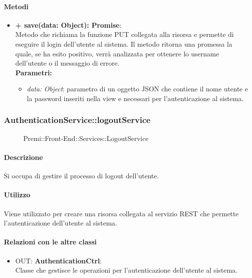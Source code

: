 		\paragraph{Metodi}
		\begin{itemize}
			\item \textbf{+ save(data: Object): Promise}:\\
			Metodo che richiama la funzione PUT collegata alla risorsa e permette di eseguire il login dell'utente al sistema. Il metodo ritorna una promessa la quale, se ha esito positivo, verrà analizzata per ottenere lo username dell'utente o il messaggio di errore. \\
			\textbf{Parametri:}\\
			\begin{itemize}
				\item \textit{data: Object}: parametro di un oggetto JSON che contiene il nome utente e la password inseriti nella view e necessari per l'autenticazione al sistema.
			\end{itemize}
		\end{itemize}
		
		
		\subsubsection{AuthenticationService::logoutService}
		\begin{figure}[h]
			\centering
			\caption[Premi::Front-End::Services::LogoutService]{Premi::Front-End::Services::LogoutService}
		\end{figure}
		
		\paragraph{Descrizione}
		Si occupa di gestire il processo di logout dell'utente.
		
		\paragraph{Utilizzo}
		Viene utilizzato per creare una risorsa collegata al servizio REST che permette l'autenticazione dell'utente al sistema.
		
		\paragraph{Relazioni con le altre classi}
		\begin{itemize}
			\item OUT: \textbf{AuthenticationCtrl}:\\
			Classe che gestisce le operazioni per l'autenticazione dell'utente al sistema.
		\end{itemize}
		
